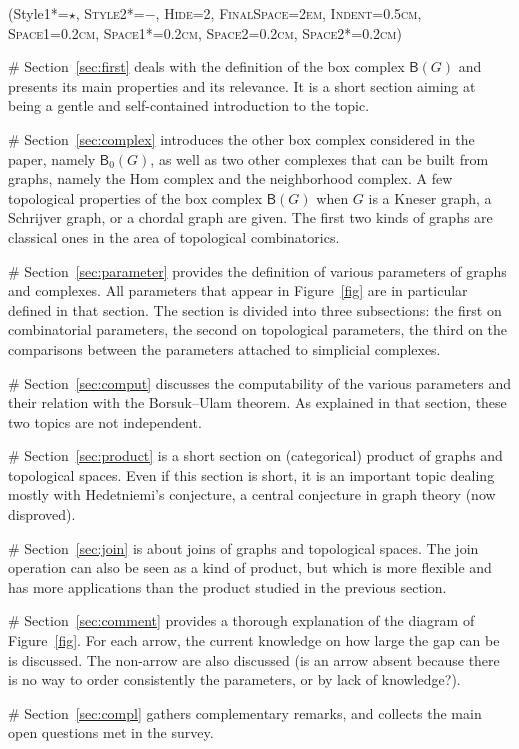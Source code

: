 \documentclass[12pt]{amsart}
\theoremstyle{definition}
\def\B{\mathsf{B}}
\begin{document}
\begin{easylist}\ListProperties(Style1*=\scshape$\star$\hspace{0.1cm}, Style2*=$-$, Hide=2, FinalSpace=2em, Indent=0.5cm, Space1=0.2cm, Space1*=0.2cm, Space2=0.2cm, Space2*=0.2cm)

# Section~\ref{sec:first} deals with the definition of the box complex $\B(G)$ and presents its main properties and its relevance. It is a short section aiming at being a gentle and self-contained introduction to the topic.

# Section~\ref{sec:complex} introduces the other box complex considered in the paper, namely $\B_0(G)$, as well as two other complexes that can be built from graphs, namely the Hom complex and the neighborhood complex. A few topological properties of the box complex $\B(G)$ when $G$ is a Kneser graph, a Schrijver graph, or a chordal graph are given. The first two kinds of graphs are classical ones in the area of topological combinatorics.

# Section~\ref{sec:parameter} provides the definition of various parameters of graphs and complexes. All parameters that appear in Figure~\ref{fig} are in particular defined in that section. The section is divided into three subsections: the first on combinatorial parameters, the second on topological parameters, the third on the comparisons between the parameters attached to simplicial complexes.

# Section~\ref{sec:comput} discusses the computability of the various parameters and their relation with the Borsuk--Ulam theorem. As explained in that section, these two topics are not independent.

# Section~\ref{sec:product} is a short section on (categorical) product of graphs and topological spaces. Even if this section is short, it is an important topic dealing mostly with Hedetniemi's conjecture, a central conjecture in graph theory (now disproved).

# Section~\ref{sec:join} is about joins of graphs and topological spaces. The join operation can also be seen as a kind of product, but which is more flexible and has more applications than the product studied in the previous section.

# Section~\ref{sec:comment} provides a thorough explanation of the diagram of Figure~\ref{fig}. For each arrow, the current knowledge on how large the gap can be is discussed. The non-arrow are also discussed (is an arrow absent because there is no way to order consistently the parameters, or by lack of knowledge?).

# Section~\ref{sec:compl} gathers complementary remarks, and collects the main open questions met in the survey.
\end{easylist}
\end{document}
